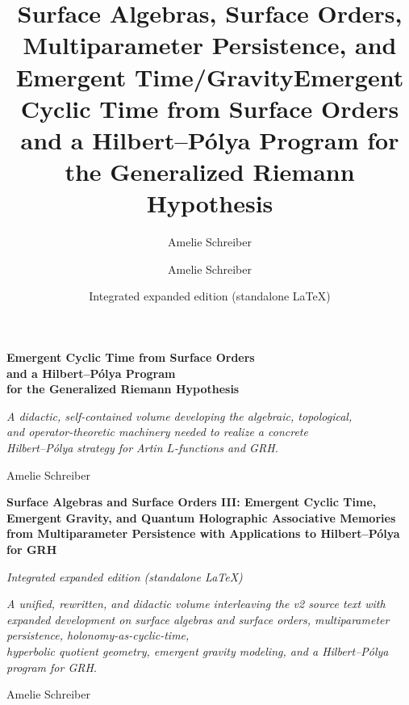 \documentclass[11pt,oneside]{amsbook}
\title{Surface Algebras, Surface Orders, Multiparameter Persistence, and Emergent Time/Gravity}
\author{Amelie Schreiber}
\date{Integrated expanded edition (standalone LaTeX)}
\title{Emergent Cyclic Time from Surface Orders and a Hilbert--P\'{o}lya Program for the Generalized Riemann Hypothesis}
\author{Amelie Schreiber}
\date{}
\numberwithin{equation}{section}
\newenvironment{hebrew}{\par\hebrewfont}{\par}
\theoremstyle{plain}
\theoremstyle{definition}
\theoremstyle{remark}
\begin{document}
\frontmatter

\begin{titlepage}
	\centering
	{\Large\bfseries Emergent Cyclic Time from Surface Orders\\[0.3em]
	and a Hilbert--P\'{o}lya Program\\[0.3em]
	for the Generalized Riemann Hypothesis\par}
	\vspace{0.7em}
	{\large\itshape A didactic, self-contained volume developing the algebraic, topological,\\
	and operator-theoretic machinery needed to realize a concrete\\
	Hilbert--P\'{o}lya strategy for Artin $L$-functions and GRH.\par}
	\vfill
	{\large Amelie Schreiber\par}
	\vspace{0.8em}
\end{titlepage}


\begin{titlepage}
	\centering
	{\Large\bfseries Surface Algebras and Surface Orders III: Emergent Cyclic Time, Emergent Gravity, and Quantum Holographic Associative Memories from Multiparameter Persistence with Applications to Hilbert--P\'{o}lya for GRH\par}
	\vspace{0.7em}
	{\large\itshape Integrated expanded edition (standalone \LaTeX)\par}
	\vspace{1.2em}
	{\large\itshape A unified, rewritten, and didactic volume interleaving the v2 source text with\\
		expanded development on surface algebras and surface orders, multiparameter persistence, holonomy-as-cyclic-time,\\
		hyperbolic quotient geometry, emergent gravity modeling, and a Hilbert--Pólya program for GRH.\par}
	\vfill
	{\large Amelie Schreiber\par}
	\vspace{0.8em}
\end{titlepage}

\cleardoublepage
\end{document}
